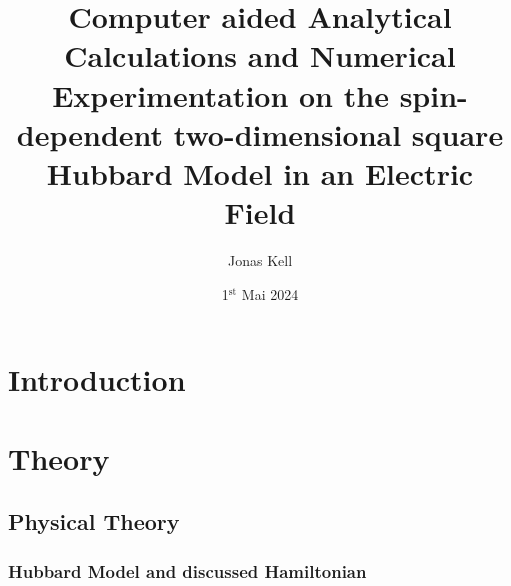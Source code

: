 \documentclass[
headings=optiontohead,              %
12pt,                               %
DIV=13,                             %
twoside=false,                      %
open=right,                         %
BCOR=00mm,                          %
toc=bibliographynumbered            %
]{scrreport}
\title{Computer aided Analytical Calculations and Numerical Experimentation on the spin-dependent two-dimensional square Hubbard Model in an Electric Field}
\author{Jonas Kell}
\date{1$^\text{st}$ Mai 2024} %
\begin{document}
\thispagestyle{empty}                           %
\cleardoublepage                                %
\pagestyle{scrheadings}                         %
\renewcommand{\contentsname}{Table of Contents} %
\tableofcontents                                %
\cleardoublepage                                %

\clearpairofpagestyles
\ihead{\leftmark}
\ohead{\Ifstr{\leftmark}{\rightmark}{}{\rightmark}}
\cfoot*{\pagemark}


\chapter{Introduction}
\label{sec:introduction}

\FloatBarrier

\chapter{Theory}
\label{sec:theory}

    \section{Physical Theory}
    \label{sec:theory-physics}
    
    \FloatBarrier
    
        \subsection{Hubbard Model and discussed Hamiltonian}
        \label{sec:theory-hubbard-hamiltonian}
        
        \FloatBarrier
        
\end{document}

